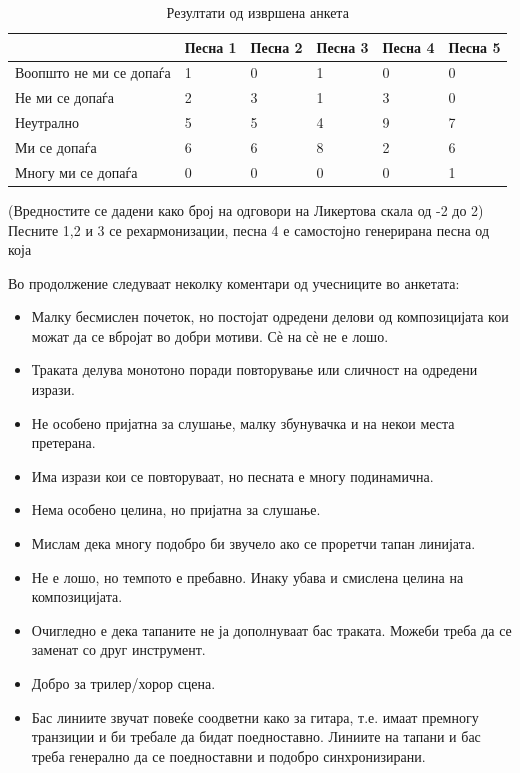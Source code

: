 \begin{table}[H]
    \centering
\begin{tabular}{@{}llllll@{}}
\toprule
   & \multicolumn{1}{c}{Песна 1} & Песна 2 & Песна 3 & Песна 4 & Песна 5 \\ \midrule
Воопшто не ми се допаѓа &  1         &   0      &   1      &   0      &   0      \\
Не ми се допаѓа         &  2         &   3      &   1      &   3      &   0      \\
Неутрално               &  5         &   5      &   4      &   9      &   7      \\
Ми се допаѓа            &  6         &   6      &   8      &   2      &   6      \\
Многу ми се допаѓа      &  0         &   0      &   0      &   0      &   1      \\ \bottomrule
\end{tabular}
    \caption{Резултати од извршена анкета}
    (Вредностите се дадени како број на одговори на Ликертова скала од -2 до 2)
    Песните 1,2 и 3 се рехармонизации, песна 4 е самостојно генерирана песна од која 
    \label{tab:anketa}
\end{table}

Во продолжение следуваат неколку коментари од учесниците во анкетата:
\begin{itemize}
    \item Малку бесмислен почеток, но постојат одредени делови од композицијата кои можат да се вбројат во добри мотиви. Сѐ на сѐ не е лошо.
    \item Траката делува монотоно поради повторување или сличност на одредени изрази.
    \item Не особено пријатна за слушање, малку збунувачка и на некои места претерана.
    \item Има изрази кои се повторуваат, но песната е многу подинамична.
    \item Нема особено целина, но пријатна за слушање.
    \item Мислам дека многу подобро би звучело ако се проретчи тапан линијата.
    \item Не е лошо, но темпото е пребавно. Инаку убава и смислена целина на композицијата.
    \item Очигледно е дека тапаните не ја дополнуваат бас траката. Можеби треба да се заменат со друг инструмент.
    \item Добро за трилер/хорор сцена.
    \item Бас линиите звучат повеќе соодветни како за гитара, т.е. имаат премногу транзиции и би требале да бидат поедноставно. Линиите на тапани и бас треба генерално да се поедноставни и подобро синхронизирани.
\end{itemize}

